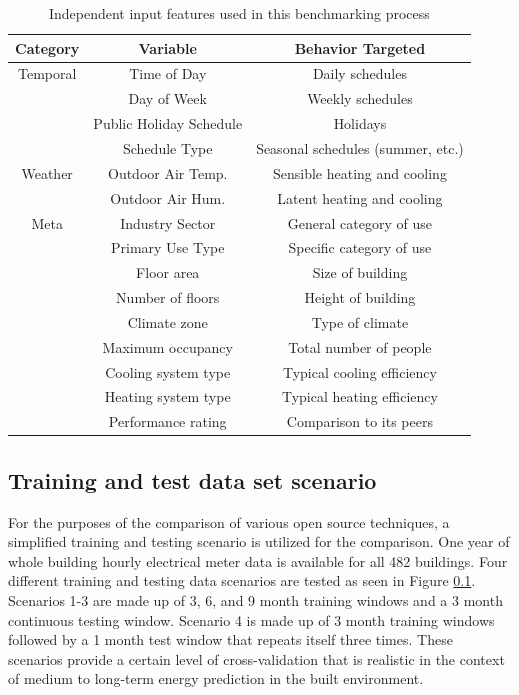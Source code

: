 \documentclass[preprint,12pt]{elsarticle}
\begin{document}
\begin{table}[h!]
\caption{Independent input features used in this benchmarking process}

\centering
\begin{tabular}{||c c c||} 
 \hline
 Category & Variable & Behavior Targeted \\ [0.5ex] 
 \hline\hline
 Temporal & Time of Day & Daily schedules \\ 
  & Day of Week  & Weekly schedules \\
  & Public Holiday Schedule & Holidays \\
  & Schedule Type & Seasonal schedules (summer, etc.) \\
 Weather & Outdoor Air Temp. & Sensible heating and cooling \\ 
  & Outdoor Air Hum. & Latent heating and cooling \\ 
 Meta & Industry Sector & General category of use \\ 
  & Primary Use Type & Specific category of use\\ 
  & Floor area & Size of building\\ 
  & Number of floors & Height of building\\ 
  & Climate zone & Type of climate\\ 
  & Maximum occupancy & Total number of people\\ 
  & Cooling system type & Typical cooling efficiency\\ 
  & Heating system type & Typical heating efficiency\\
  & Performance rating & Comparison to its peers\\[1ex] 
 \hline
\end{tabular}
\label{table:inputs}
\end{table}

\subsection{Training and test data set scenario}
\label{sec:trainingandtesting}

For the purposes of the comparison of various open source techniques, a simplified training and testing scenario is utilized for the comparison. One year of whole building hourly electrical meter data is available for all 482 buildings. Four different training and testing data scenarios are tested as seen in Figure \ref{sec:trainingandtesting}. Scenarios 1-3 are made up of 3, 6, and 9 month training windows and a 3 month continuous testing window. Scenario 4 is made up of 3 month training windows followed by a 1 month test window that repeats itself three times. These scenarios provide a certain level of cross-validation that is realistic in the context of medium to long-term energy prediction in the built environment. 
\end{document}
